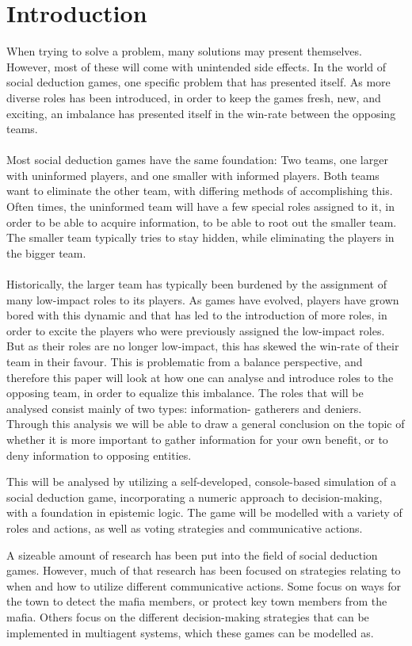 \section{Introduction}
When trying to solve a problem, many solutions may present themselves. However,
most of these will come with unintended side effects. In the world of social
deduction games, one specific problem that has presented itself. As more diverse roles has been introduced, in order to keep the games
fresh, new, and exciting, an imbalance has presented itself in the win-rate
between the opposing teams. \\ \\ Most social deduction games have the same
foundation: Two teams, one larger with uninformed players, and one smaller with
informed players. Both teams want to eliminate the other team, with differing
methods of accomplishing this. Often times, the uninformed team will have a few
special roles assigned to it, in order to be able to acquire information, to be
able to root out the smaller team. The smaller team typically tries to stay
hidden, while eliminating the players in the bigger team.\\ \\ Historically,
the larger team has typically been burdened by the assignment of many
low-impact roles to its players. As games have evolved, players have grown
bored with this dynamic and that has led to the introduction of more roles, in order
to excite the players who were previously assigned the low-impact roles. But as
their roles are no longer low-impact, this has skewed the win-rate of their
team in their favour. This is problematic from a balance perspective, and
therefore this paper will look at how one can analyse and introduce roles to
the opposing team, in order to equalize this imbalance. The roles that will be
analysed consist mainly of two types: information- gatherers and deniers. 
Through this analysis we will be able to draw a general conclusion on
the topic of whether it is more important to gather information for your own
benefit, or to deny information to opposing entities.

This will be analysed by utilizing a self-developed, console-based simulation
of a social deduction game, incorporating a numeric approach to decision-making, with a
foundation in epistemic logic. The game will be modelled with a variety of
roles and actions, as well as voting strategies and communicative actions.

A sizeable amount of research has been put into the field of social deduction
games. However, much of that research has been focused on strategies relating
to when and how to utilize different communicative actions\cite{commitment}.
Some focus on ways for the town to detect the mafia
members\cite{werewolf_stealth}, or protect key town members from the
mafia\cite{werewolf_nash_equilibrium}. Others focus on the different
decision-making strategies that can be implemented in multiagent systems, which
these games can be modelled
as\cite{modelling_multi_agent_epistemic_systems}\cite{multi_agent_epistemic_planner_common_knowledge}\cite{probibalistic_multiagent_systems}.

